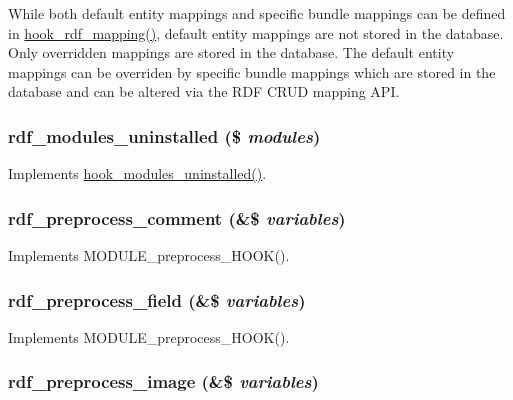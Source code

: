 While both default entity mappings and specific bundle mappings can be defined in \hyperlink{group__rdf_gae3e7f047bdcb9309b323e2af09966765}{hook\_\-rdf\_\-mapping()}, default entity mappings are not stored in the database. Only overridden mappings are stored in the database. The default entity mappings can be overriden by specific bundle mappings which are stored in the database and can be altered via the RDF CRUD mapping API. \hypertarget{rdf_8module_a42149a7e3a19a0507a95a5824543b1a1}{
\subsubsection[{rdf\_\-modules\_\-uninstalled}]{\setlength{\rightskip}{0pt plus 5cm}rdf\_\-modules\_\-uninstalled (\$ {\em modules})}}
\label{rdf_8module_a42149a7e3a19a0507a95a5824543b1a1}
Implements \hyperlink{group__hooks_ga4f29c7343438068a922459cbe0810279}{hook\_\-modules\_\-uninstalled()}. \hypertarget{rdf_8module_aa3c09f2ba4944d2e527c029169023cf7}{
\subsubsection[{rdf\_\-preprocess\_\-comment}]{\setlength{\rightskip}{0pt plus 5cm}rdf\_\-preprocess\_\-comment (\&\$ {\em variables})}}
\label{rdf_8module_aa3c09f2ba4944d2e527c029169023cf7}
Implements MODULE\_\-preprocess\_\-HOOK(). \hypertarget{rdf_8module_ae9c71899b7a78b1f00a399b2c94bc020}{
\subsubsection[{rdf\_\-preprocess\_\-field}]{\setlength{\rightskip}{0pt plus 5cm}rdf\_\-preprocess\_\-field (\&\$ {\em variables})}}
\label{rdf_8module_ae9c71899b7a78b1f00a399b2c94bc020}
Implements MODULE\_\-preprocess\_\-HOOK(). \hypertarget{rdf_8module_ad2184c38430ea63d16631cbde524e211}{
\subsubsection[{rdf\_\-preprocess\_\-image}]{\setlength{\rightskip}{0pt plus 5cm}rdf\_\-preprocess\_\-image (\&\$ {\em variables})}}
